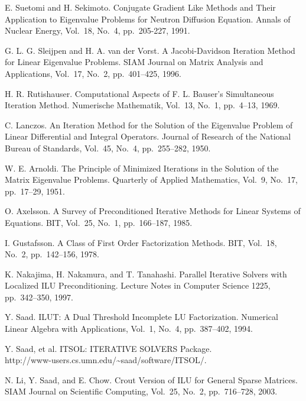 \documentclass[a4paper]{jarticle}
\begin{document}
{{\begin{thebibliography}{10}
E. Suetomi and H. Sekimoto.
\newblock Conjugate Gradient Like Methods and Their Application to
	Eigenvalue Problems for Neutron Diffusion Equation.
\newblock Annals of Nuclear Energy, Vol.~18, No.~4, pp.\ 205-227, 1991.

G. L. G. Sleijpen and H. A. van der Vorst.
\newblock A Jacobi-Davidson Iteration Method for Linear Eigenvalue Problems.
\newblock SIAM Journal on Matrix Analysis and Applications, Vol.~17, No.~2, pp.\ 401--425, 1996.

H. R. Rutishauser.
\newblock Computational Aspects of F. L. Bauser's Simultaneous Iteration
	Method.
\newblock Numerische Mathematik, Vol.~13, No.~1, pp.\ 4--13, 1969.

C. Lanczos.
\newblock An Iteration Method for the Solution of the Eigenvalue Problem
	of Linear Differential and Integral Operators.
\newblock Journal of Research of the National Bureau of Standards, Vol.~45, No.~4, pp.\ 255--282, 1950.

W. E. Arnoldi.
\newblock The Principle of Minimized Iterations in the Solution of the Matrix Eigenvalue Problems.
\newblock Quarterly of Applied Mathematics, Vol.~9, No.~17, pp.\ 17--29, 1951.

O. Axelsson.
\newblock A Survey of Preconditioned Iterative Methods for Linear
	Systems of Equations.
\newblock BIT, Vol.~25, No.~1, pp.\ 166--187, 1985.

I. Gustafsson.
\newblock A Class of First Order Factorization Methods.
\newblock BIT, Vol.~18, No.~2, pp.\ 142--156, 1978.

K. Nakajima, H. Nakamura, and T. Tanahashi.
\newblock Parallel Iterative Solvers with Localized ILU Preconditioning.
\newblock Lecture Notes in Computer Science 1225, pp.\ 342--350, 1997.

Y. Saad.
\newblock ILUT: A Dual Threshold Incomplete LU Factorization.
\newblock Numerical Linear Algebra with Applications, Vol.~1, No.~4, pp.\ 387--402, 1994. 

Y. Saad, et al.
\newblock ITSOL: ITERATIVE SOLVERS Package. \\
\newblock http://www-users.cs.umn.edu/\textasciitilde saad/software/ITSOL/.

N. Li, Y. Saad, and E. Chow.
\newblock Crout Version of ILU for General Sparse Matrices.
\newblock SIAM Journal on Scientific Computing, Vol.~25, No.~2, pp.\ 716--728, 2003. 


\end{thebibliography}}}
\end{document}
